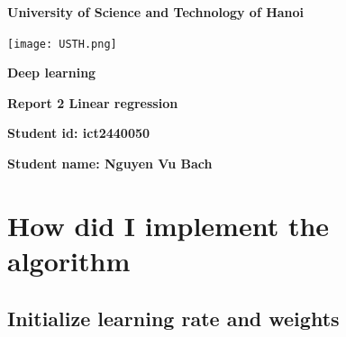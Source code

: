 \documentclass[12pt]{article}
\begin{document}
\thispagestyle{empty} %
\begin{center}
    \vspace{7pt}
    \fontsize{18pt}{17pt}\selectfont 
    \textbf{University of Science and Technology of Hanoi}
    \vspace{7pt}
\end{center}
\vspace{10pt}
\begin{center}
    \texttt{[image: USTH.png]}
\end{center}

\vspace{90pt}

\begin{center}
    \fontsize{30pt}{17pt}\selectfont 
    \textbf{Deep learning} 
    \vspace{50pt}

    \fontsize{20pt}{17pt}\selectfont 
    \textbf{Report 2 Linear regression}
    \vspace{50pt}


    \fontsize{17pt}{17pt}\selectfont
    \textbf{{Student id: }{ict2440050}}
    \vspace{15pt}

    \fontsize{17pt}{17pt}\selectfont
    \textbf{{Student name: }{Nguyen Vu Bach}}
    \vspace{15pt}
    
\end{center}

\newpage
\setcounter{page}{1} %
\section{How did I implement the algorithm}

\subsection{Initialize learning rate and weights}
\end{document}
